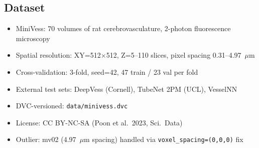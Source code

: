 
\subsection{Dataset}
\begin{itemize}
  \item MiniVess: 70 volumes of rat cerebrovasculature, 2-photon fluorescence microscopy
  \item Spatial resolution: XY=512$\times$512, Z=5--110 slices, pixel spacing 0.31--4.97~$\mu$m
  \item Cross-validation: 3-fold, seed=42, 47 train / 23 val per fold
  \item External test sets: DeepVess (Cornell), TubeNet 2PM (UCL), VesselNN
  \item DVC-versioned: \texttt{data/minivess.dvc}
  \item License: CC BY-NC-SA (Poon et al.\ 2023, Sci.\ Data)
  \item Outlier: mv02 (4.97~$\mu$m spacing) handled via \texttt{voxel\_spacing=(0,0,0)} fix
\end{itemize}
